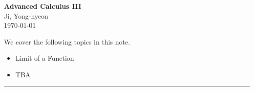 \documentclass[11pt,openany]{article}
\begin{document}
\begin{center}
	\huge\textbf{Advanced Calculus III}\\
	\vspace{0.5em}
	\large{Ji, Yong-hyeon}\\
	\vspace{0.5em}
	\normalsize{\today}\\
\end{center}

\noindent 
We cover the following topics in this note.
\begin{itemize}
	\item Limit of a Function
	\item TBA
\end{itemize}
\hrule\vspace{12pt}

\newpage
\end{document}
